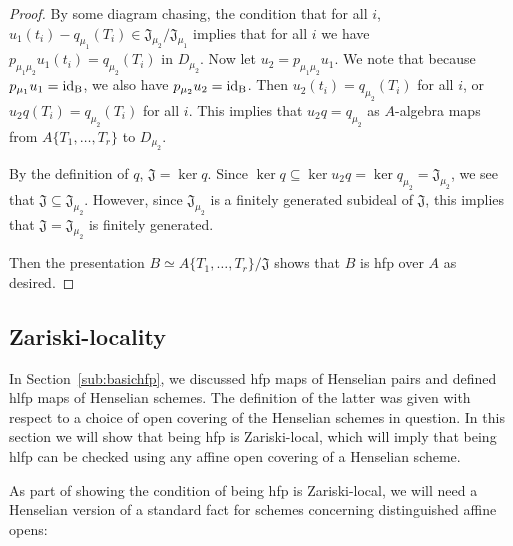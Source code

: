 \documentclass[12pt]{article}
\newcommand{\J}{\mathfrak{J}}
\newcommand{\hlfp}{hlfp\xspace}
\newcommand{\hfp}{hfp\xspace}
\theoremstyle{definition}
\numberwithin{equation}{subsection}
\begin{document}
\begin{proof}
By some diagram chasing, the condition that for all $i$, $u_1(t_i)-q_{\mu_1}(T_i) \in \J_{\mu_2}/\J_{\mu_1}$ implies that for all $i$ we have $p_{\mu_1\mu_2}u_1(t_i)=q_{\mu_2}(T_i)$ in $D_{\mu_2}$. Now let $u_2=p_{\mu_1\mu_2}u_1$. We note that because $p_{\mu_1}u_1=\rm{id}_B$, we also have $p_{\mu_2}u_2=\rm{id}_B$. Then $u_2(t_i)=q_{\mu_2}(T_i)$ for all $i$, or $u_2q(T_i)=q_{\mu_2}(T_i)$ for all $i$. This implies that $u_2q=q_{\mu_2}$ as $A$-algebra maps from $A\{T_1,\dots,T_r\}$ to $D_{\mu_2}$. 


By the definition of $q$, $\J = \ker q$. Since $\ker q \subseteq \ker u_2q = \ker q_{\mu_2} = \J_{\mu_2}$, we see that $\J \subseteq \J_{\mu_2}$. However, since $\J_{\mu_2}$ is a finitely generated subideal of $\J$, this implies that $\J=\J_{\mu_2}$ is finitely generated.

Then the presentation $B \simeq A\{T_1,\dots,T_r\}/\J$ shows that $B$ is \hfp over $A$ as desired. \end{proof}

\subsection{Zariski-locality}

In Section~\ref{sub:basichfp}, we discussed \hfp maps of Henselian pairs and defined \hlfp maps of Henselian schemes. The definition of the latter was given with respect to a choice of open covering of the Henselian schemes in question. In this section we will show that being \hfp is Zariski-local, which will imply that being \hlfp can be checked using any affine open covering of a Henselian scheme.

As part of showing the condition of being \hfp is Zariski-local, we will need a Henselian version of a standard fact for schemes concerning distinguished affine opens:
\end{document}
